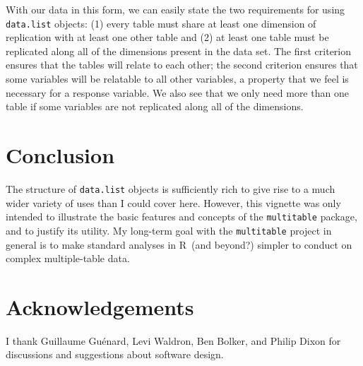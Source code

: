 \documentclass{article}
\newcommand{\R}{{\sf R}}
\newcommand{\code}[1]{\texttt{#1}}
\numberwithin{exercise}{section}
\begin{document}
With our data in this form, we can easily state the two requirements for using \code{data.list} objects:  (1) every table must share at least one dimension of replication with at least one other table and (2) at least one table must be replicated along all of the dimensions present in the data set.  The first criterion ensures that the tables will relate to each other; the second criterion ensures that some variables will be relatable to all other variables, a property that we feel is necessary for a response variable.  We also see that we only need more than one table if some variables are not replicated along all of the dimensions.

\section{Conclusion}

The structure of \code{data.list} objects is sufficiently rich to give rise to a much wider variety of uses than I could cover here.  However, this vignette was only intended to illustrate the basic features and concepts of the \code{multitable} package, and to justify its utility.  My long-term goal with the \code{multitable} project in general is to make standard analyses in \R\ (and beyond?) simpler to conduct on complex multiple-table data.

\section*{Acknowledgements}
I thank Guillaume Gu\'{e}nard, Levi Waldron, Ben Bolker, and Philip Dixon for discussions and suggestions about software design.



\end{document}
